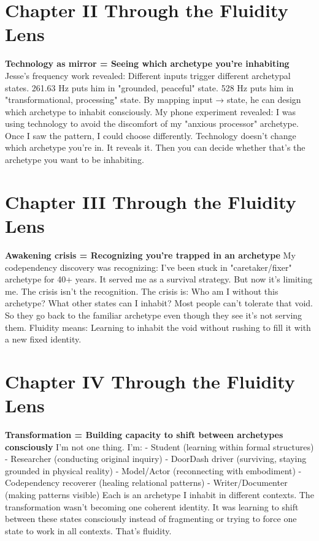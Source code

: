 \documentclass[12pt,openany]{book}
\begin{document}
\section{Chapter II Through the Fluidity Lens}

\textbf{Technology as mirror = Seeing which archetype you're inhabiting}
Jesse's frequency work revealed: Different inputs trigger different archetypal states. 261.63 Hz puts him in "grounded, peaceful" state. 528 Hz puts him in "transformational, processing" state.
By mapping input → state, he can design which archetype to inhabit consciously.
My phone experiment revealed: I was using technology to avoid the discomfort of my "anxious processor" archetype. Once I saw the pattern, I could choose differently.
Technology doesn't change which archetype you're in. It reveals it. Then you can decide whether that's the archetype you want to be inhabiting.

\section{Chapter III Through the Fluidity Lens}

\textbf{Awakening crisis = Recognizing you're trapped in an archetype}
My codependency discovery was recognizing: I've been stuck in "caretaker/fixer" archetype for 40+ years. It served me as a survival strategy. But now it's limiting me.
The crisis isn't the recognition. The crisis is: Who am I without this archetype? What other states can I inhabit?
Most people can't tolerate that void. So they go back to the familiar archetype even though they see it's not serving them.
Fluidity means: Learning to inhabit the void without rushing to fill it with a new fixed identity.

\section{Chapter IV Through the Fluidity Lens}

\textbf{Transformation = Building capacity to shift between archetypes consciously}
I'm not one thing. I'm:
- Student (learning within formal structures)
- Researcher (conducting original inquiry)
- DoorDash driver (surviving, staying grounded in physical reality)
- Model/Actor (reconnecting with embodiment)
- Codependency recoverer (healing relational patterns)
- Writer/Documenter (making patterns visible)
Each is an archetype I inhabit in different contexts.
The transformation wasn't becoming one coherent identity. It was learning to shift between these states consciously instead of fragmenting or trying to force one state to work in all contexts.
That's fluidity.
\end{document}
